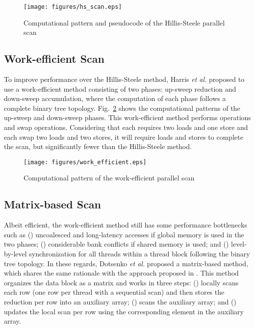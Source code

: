 \documentclass[article]{elsarticle}
\renewcommand{\hl}[1]{#1}
\begin{document}
{\begin{figure}[!h]
\centering
\begin{minipage}[c]{0.3\linewidth}
\centering
\texttt{[image: figures/hs\_scan.eps]}
\end{minipage}
\begin{minipage}[c]{0.68\linewidth}
\centering
\hsscankernel
\end{minipage}
\caption{Computational pattern and pseudocode of the Hillis-Steele parallel scan}
\label{fig:hs_scan}
\end{figure}
\subsection{Work-efficient Scan}
\label{sec:work_efficient}
To improve performance over the Hillis-Steele method, Harris \textit{et al.} \cite{harris2007parallel} proposed to use a work-efficient method consisting of two phases: up-sweep reduction and down-sweep accumulation, where the computation of each phase follows a complete binary tree topology. Fig.~\ref{fig:work_efficient} shows the computational patterns of the up-sweep and down-sweep phases. This work-efficient method performs \mbox{}  operations and \mbox{} swap operations. Considering that each  requires two loads and one store and each swap two loads and two stores, it will require \mbox{} loads and \mbox{} stores to complete the scan, but significantly fewer than the Hillis-Steele method.
\begin{figure}[!h]
\centering
\texttt{[image: figures/work\_efficient.eps]}
\caption{Computational pattern of the work-efficient parallel scan}
\label{fig:work_efficient}
\end{figure}
\subsection{Matrix-based Scan}
\label{sec:matrix_scan}
Albeit efficient, the work-efficient method still has some performance bottlenecks such as () uncoalesced and long-latency accesses if global memory is used in the two phases; () considerable bank conflicts if shared memory is used; and () level-by-level synchronization for all threads within a thread block following the binary tree topology. In these regards, Dotsenko \textit{et al.} \cite{dotsenko2008fast} proposed a matrix-based method, \hl{which shares the same rationale with the approach proposed in \cite{blelloch1989scans}}. This method organizes the data block as a matrix and works in three steps: () locally scans each row (one row per thread with a sequential scan) and then stores the reduction per row into an auxiliary array; () scans the auxiliary array; and () updates the local scan per row using the corresponding element in the auxiliary array.

}
\end{document}
